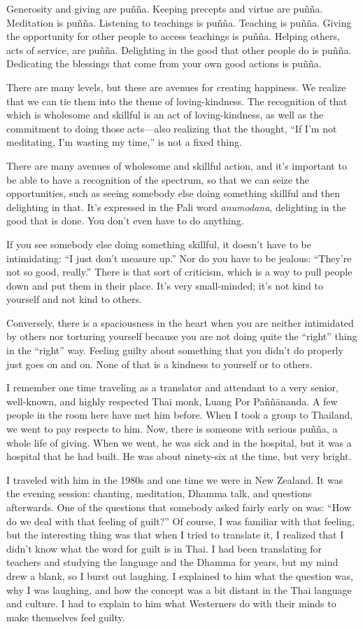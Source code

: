 Generosity and giving are puñña. Keeping precepts and virtue are puñña.
Meditation is puñña. Listening to teachings is puñña. Teaching is puñña.
Giving the opportunity for other people to access teachings is puñña.
Helping others, acts of service, are puñña. Delighting in the good that
other people do is puñña. Dedicating the blessings that come from your
own good actions is puñña.

There are many levels, but these are avenues for creating happiness. We
realize that we can tie them into the theme of loving-kindness. The
recognition of that which is wholesome and skillful is an act of
loving-kindness, as well as the commitment to doing those acts—also
realizing that the thought, “If I’m not meditating, I’m wasting my
time,” is not a fixed thing.

There are many avenues of wholesome and skillful action, and it’s
important to be able to have a recognition of the spectrum, so that we
can seize the opportunities, such as seeing somebody else doing
something skillful and then delighting in that. It’s expressed in the
Pali word \emph{anumodana}, delighting in the good that is done. You
don’t even have to do anything.

If you see somebody else doing something skillful, it doesn’t have to be
intimidating: “I just don’t measure up.” Nor do you have to be jealous:
“They’re not so good, really.” There is that sort of criticism, which is
a way to pull people down and put them in their place. It’s very
small-minded; it’s not kind to yourself and not kind to others.

Conversely, there is a spaciousness in the heart when you are neither
intimidated by others nor torturing yourself because you are not doing
quite the “right” thing in the “right” way. Feeling guilty about
something that you didn’t do properly just goes on and on. None of that
is a kindness to yourself or to others.

I remember one time traveling as a translator and attendant to a very
senior, well-known, and highly respected Thai monk, Luang Por
Paññānanda. A few people in the room here have met him before. When I
took a group to Thailand, we went to pay respects to him. Now, there is
someone with serious puñña, a whole life of giving. When we went, he was
sick and in the hospital, but it was a hospital that he had built. He
was about ninety-six at the time, but very bright.

I traveled with him in the 1980s and one time we were in New Zealand. It
was the evening session: chanting, meditation, Dhamma talk, and
questions afterwards. One of the questions that somebody asked fairly
early on was: “How do we deal with that feeling of guilt?” Of course, I
was familiar with that feeling, but the interesting thing was that when
I tried to translate it, I realized that I didn’t know what the word for
guilt is in Thai. I had been translating for teachers and studying the
language and the Dhamma for years, but my mind drew a blank, so I burst
out laughing. I explained to him what the question was, why I was
laughing, and how the concept was a bit distant in the Thai language and
culture. I had to explain to him what Westerners do with their minds to
make themselves feel guilty.

